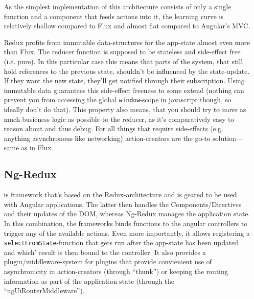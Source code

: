 As the simplest implementation of this architecture consists of only a single function and a component that feeds actions into it, the learning curve is relatively shallow compared to Flux and almost flat compared to Angular's MVC.

Redux profits from immutable data-structures for the app-state almost even more than Flux. The reducer function is supposed to be stateless and side-effect free (i.e. pure). In this particular case this means that parts of the system, that still hold references to the previous state, shouldn't be influenced by the state-update. If they want the new state, they'll get notified through their subscription. Using immutable data guarantees this side-effect freeness to some extend (nothing can
prevent you from accessing the global \texttt{window}-scope in javascript though, so ideally don't do that). This property also means, that you should try to move as much busieness logic as possible to the reducer, as it's comparatively easy to reason about and thus debug. For all things that require side-effects (e.g. anything asynchronous like networking) action-creators are the go-to solution---same as in Flux.

\subsection{Ng-Redux}\label{ref:ng-redux}

 is framework that's based on the Redux-architecture and is geared to be used with Angular applications. The latter then handles the Components/Directives and their updates of the DOM, whereas Ng-Redux manages the application state. In this combination, the frameworks binds functions to the angular controllers to trigger any of the available actions. Even more importantly, it allows registering a \texttt{selectFromState}-function that gets run after
the app-state has been updated and which' result is then bound to the controller. It also provides a plugin/middleware-system for plugins that provide convienient use of asynchronicity in action-creators (through ``thunk'') or keeping the routing information as part of the application state (through the ``ngUiRouterMiddleware'').

